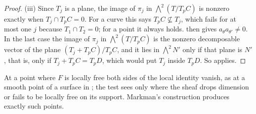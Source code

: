 \begin{proof}
(iii) Since $T_{j}$ is a plane, the image of $\pi_{j}$ in
$\bigwedge^{2}(T/T_{p}C)$ is nonzero exactly when $T_{j}\cap T_{p}C=0$. For a
curve this says $T_{p}C\not\subseteq T_{j}$, which fails for at most one $j$
because $T_{1}\cap T_{2}=0$; for a point it always holds. 
then gives $a_{\theta}a_{\theta'}\ne0$. In the last case the image of
$\pi_{j}$ in $\bigwedge^{2}(T/T_{p}C)$ is the nonzero decomposable vector of
the plane $(T_{j}+T_{p}C)/T_{p}C$, and it lies in $\bigwedge^{2}N'$ only if
that plane is $N'$, that is, only if $T_{j}+T_{p}C=T_{p}D$, which would put
$T_{j}$ inside $T_{p}D$. So  applies.
\end{proof}

At a point where $F$ is locally free both sides of the local identity vanish,
as at a smooth point of a surface in ; the test sees
only where the sheaf drops dimension or fails to be locally free on its
support. Markman's construction produces exactly such points.

